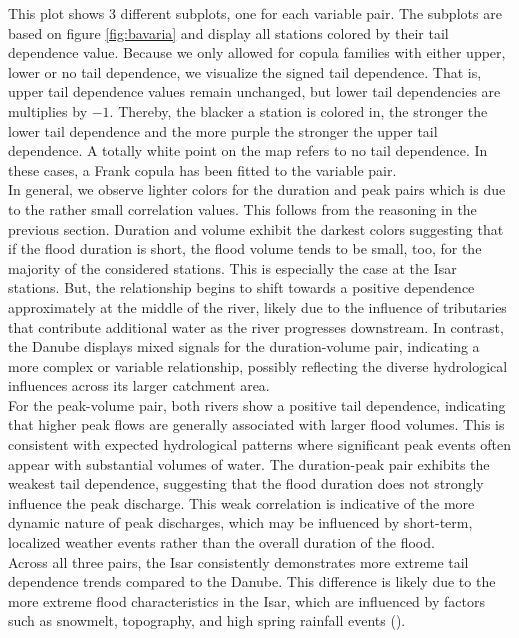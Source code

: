 \documentclass[
]{krantz}
\begin{document}
This plot shows \(3\) different subplots, one for each variable pair.
The subplots are based on figure \ref{fig:bavaria} and display all stations colored by their
tail dependence value.
Because we only allowed for copula families with either upper, lower or no tail dependence,
we visualize the signed tail dependence.
That is, upper tail dependence values remain unchanged, but lower tail dependencies are multiplies by
\(-1\). Thereby, the blacker a station is colored in, the stronger the lower tail dependence and the more
purple the stronger the upper tail dependence. A totally white point on the map refers to no tail dependence.
In these cases, a Frank copula has been fitted to the variable pair.\\
In general, we observe lighter colors for the duration and peak pairs which is due to the rather
small correlation values. This follows from the reasoning in the previous section.
Duration and volume exhibit the darkest colors suggesting that if the flood duration is short, the
flood volume tends to be small, too, for the majority of the considered stations.
This is especially the case at the Isar stations. But, the relationship begins to shift towards a positive dependence approximately at the middle of the river, likely due to the influence of tributaries that contribute additional water as the river progresses downstream.
In contrast, the Danube displays mixed signals for the duration-volume pair, indicating a more complex or variable relationship, possibly reflecting the diverse hydrological influences across its larger catchment area.\\
For the peak-volume pair, both rivers show a positive tail dependence, indicating that higher peak flows are generally associated with larger flood volumes. This is consistent with expected hydrological patterns where significant peak events often appear with substantial volumes of water. The duration-peak pair exhibits the weakest tail dependence, suggesting that the flood duration does not strongly influence the peak discharge. This weak correlation is indicative of the more dynamic nature of peak discharges, which may be influenced by short-term, localized weather events rather than the overall duration of the flood.\\
Across all three pairs, the Isar consistently demonstrates more extreme tail dependence trends compared to the Danube. This difference is likely due to the more extreme flood characteristics in the Isar, which are influenced by factors such as snowmelt, topography, and high spring rainfall events (\citet{parajkaa2019}).
\end{document}
